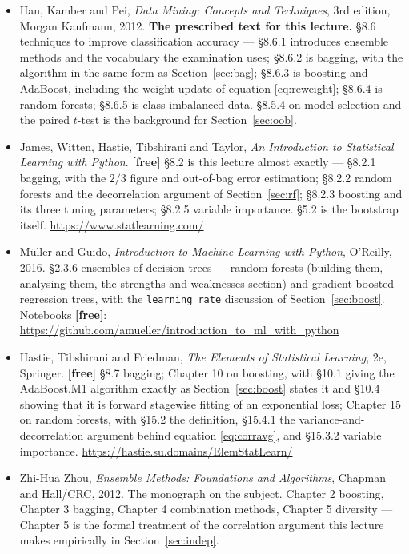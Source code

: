 \documentclass[11pt]{article}
\begin{document}
\begin{itemize}[leftmargin=*]
  \item Han, Kamber and Pei, \emph{Data Mining: Concepts and Techniques}, 3rd
    edition, Morgan Kaufmann, 2012. \textbf{The prescribed text for this
    lecture.} \S8.6 techniques to improve classification accuracy ---
    \S8.6.1 introduces ensemble methods and the vocabulary the examination
    uses; \S8.6.2 is bagging, with the algorithm in the same form as
    Section~\ref{sec:bag}; \S8.6.3 is boosting and AdaBoost, including the
    weight update of equation \eqref{eq:reweight}; \S8.6.4 is random forests;
    \S8.6.5 is class-imbalanced data. \S8.5.4 on model selection and the
    paired $t$-test is the background for Section~\ref{sec:oob}.
  \item James, Witten, Hastie, Tibshirani and Taylor, \emph{An Introduction to
    Statistical Learning with Python}. \textbf{[free]} \S8.2 is this lecture
    almost exactly --- \S8.2.1 bagging, with the $2/3$ figure and out-of-bag
    error estimation; \S8.2.2 random forests and the decorrelation argument of
    Section~\ref{sec:rf}; \S8.2.3 boosting and its three tuning parameters;
    \S8.2.5 variable importance. \S5.2 is the bootstrap itself.
    \url{https://www.statlearning.com/}
  \item M\"uller and Guido, \emph{Introduction to Machine Learning with
    Python}, O'Reilly, 2016. \S2.3.6 ensembles of decision trees --- random
    forests (building them, analysing them, the strengths and weaknesses
    section) and gradient boosted regression trees, with the
    \texttt{learning\_rate} discussion of Section~\ref{sec:boost}. Notebooks
    \textbf{[free]}:
    \url{https://github.com/amueller/introduction_to_ml_with_python}
  \item Hastie, Tibshirani and Friedman, \emph{The Elements of Statistical
    Learning}, 2e, Springer. \textbf{[free]} \S8.7 bagging; Chapter 10 on
    boosting, with \S10.1 giving the AdaBoost.M1 algorithm exactly as
    Section~\ref{sec:boost} states it and \S10.4 showing that it is forward
    stagewise fitting of an exponential loss; Chapter 15 on random forests,
    with \S15.2 the definition, \S15.4.1 the variance-and-decorrelation
    argument behind equation \eqref{eq:corravg}, and \S15.3.2 variable
    importance. \url{https://hastie.su.domains/ElemStatLearn/}
  \item Zhi-Hua Zhou, \emph{Ensemble Methods: Foundations and Algorithms},
    Chapman and Hall/CRC, 2012. The monograph on the subject. Chapter 2
    boosting, Chapter 3 bagging, Chapter 4 combination methods, Chapter 5
    diversity --- Chapter 5 is the formal treatment of the correlation
    argument this lecture makes empirically in Section~\ref{sec:indep}.
\end{itemize}
\end{document}
